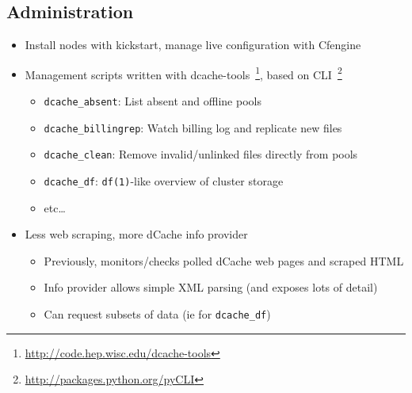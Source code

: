 \documentclass{beamer}
\begin{document}
\subsection{Administration}
\begin{frame}
\begin{itemize}
	\item Install nodes with kickstart, manage live configuration with Cfengine
	\item Management scripts written with dcache-tools~\footnote{\url{http://code.hep.wisc.edu/dcache-tools}}, based on CLI~\footnote{\url{http://packages.python.org/pyCLI}}
	\begin{itemize}
		\item {\tt dcache\_absent}: List absent and offline pools
		\item {\tt dcache\_billingrep}: Watch billing log and replicate new files
		\item {\tt dcache\_clean}: Remove invalid/unlinked files directly from pools
		\item {\tt dcache\_df}: {\tt df(1)}-like overview of cluster storage
		\item etc\ldots{}
	\end{itemize}
	\item Less web scraping, more dCache info provider
	\begin{itemize}
		\item Previously, monitors/checks polled dCache web pages and scraped HTML
		\item Info provider allows simple XML parsing (and exposes lots of detail)
		\item Can request subsets of data (ie for {\tt dcache\_df})
	\end{itemize}
\end{itemize}
\end{frame}
\end{document}
